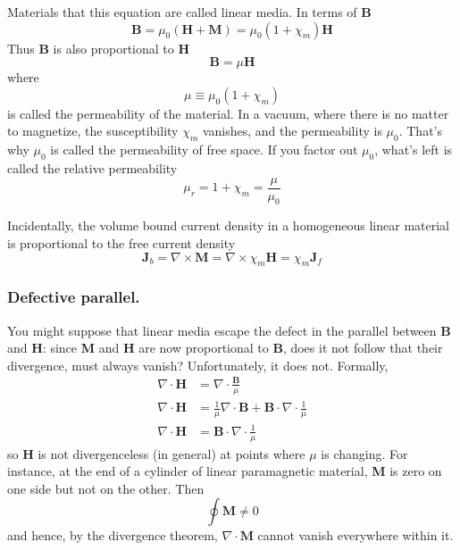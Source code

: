 \documentclass[../../../main.tex]{subfiles}
\begin{document}
Materials that this equation are called linear media. In terms of \textbf{B}
\begin{equation*}
    \mathbf{B} = \mu_0(\mathbf{H} + \mathbf{M}) = \mu_0(1 + \chi_m )\mathbf{H}
\end{equation*}
Thus \textbf{B} is also proportional to \textbf{H}
\begin{equation*}
    \mathbf{B}=\mu\mathbf{H}
\end{equation*}
where
\begin{equation*}
    \mu\equiv\mu_0(1 + \chi_m )
\end{equation*}
is called the permeability of the material. In a vacuum, where there is no matter to magnetize, the susceptibility $\chi_m$ vanishes, and the permeability is $\mu_0$. That’s why $\mu_0$ is called the permeability of free space. If you factor out $\mu_0$, what’s left is called the relative permeability
\begin{equation*}
    \mu_r=1 + \chi_m=\frac{\mu}{\mu_0}
\end{equation*}

Incidentally, the volume bound current density in a homogeneous linear material is proportional to the free current density
\begin{equation*}
    \mathbf{J}_b=\nabla\times \mathbf{M}=\nabla\times \chi_m \mathbf{H}=\chi_m\mathbf{J}_f
\end{equation*}

\subsubsection{Defective parallel.} You might suppose that linear media escape the defect in the parallel between \textbf{B} and \textbf{H}: since \textbf{M} and \textbf{H} are now proportional to \textbf{B}, does it not follow that their divergence, must always vanish? Unfortunately, it does not. Formally,
\begin{align*}
    \nabla\cdot\mathbf{H}&= \nabla\cdot\frac{\mathbf{B}}{\mu}\\
    \nabla\cdot\mathbf{H}&=\frac{1}{\mu}\nabla\cdot\mathbf{B}+\mathbf{B}\cdot\nabla\cdot\frac{1}{\mu}\\
    \nabla\cdot\mathbf{H}&=\mathbf{B}\cdot\nabla\cdot\frac{1}{\mu}
\end{align*}
so \textbf{H} is not divergenceless (in general) at points where $\mu$ is changing. For instance, at the end of a cylinder of linear paramagnetic material, \textbf{M} is zero on one side but not on the other. Then 
\begin{equation*}
    \oint\mathbf{M}\neq 0
\end{equation*}
and hence, by the divergence theorem, $\nabla\cdot\mathbf{M}$ cannot vanish everywhere within it.
\end{document}

